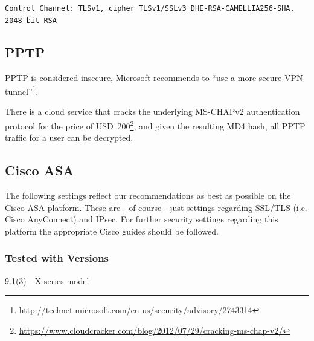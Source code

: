 \verb|Control Channel: TLSv1, cipher TLSv1/SSLv3 DHE-RSA-CAMELLIA256-SHA, 2048 bit RSA|


\subsection{PPTP}

PPTP is considered insecure, Microsoft recommends to ``use a more secure VPN
tunnel''\footnote{\url{http://technet.microsoft.com/en-us/security/advisory/2743314}}.

There is a cloud service that cracks the underlying MS-CHAPv2
authentication protocol for the price of USD~200\footnote{\url{https://www.cloudcracker.com/blog/2012/07/29/cracking-ms-chap-v2/}},
and given the resulting MD4 hash, all PPTP traffic for a user can
be decrypted.

\subsection{Cisco ASA}
The following settings reflect our recommendations as best as possible on the Cisco ASA platform. These are - of course - just settings regarding SSL/TLS (i.e. Cisco AnyConnect) and IPsec. For further security settings regarding this platform the appropriate Cisco guides should be followed.


\subsubsection{Tested with Versions}
\begin{itemize*}
  \item 9.1(3) - X-series model
\end{itemize*}

